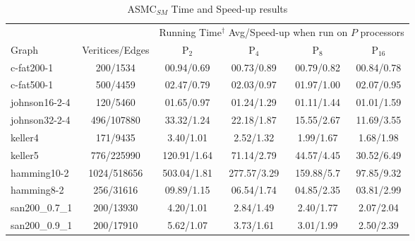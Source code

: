 \documentclass[11pt]{article}
\begin{document}
\linespread{1}
\begin{table*}[ht!]
\caption{ASMC$_{SM}$ Time and Speed-up results}\label{tab:spar_su_par_table}
\begin{footnotesize}
\begin{center}
\begin{tabular}{|l||c||c|c|c|c|}
\hline
&              & \multicolumn{4}{|c|}{Running Time$^{\dag}$ Avg/Speed-up when run on $P$ processors}\\
\cline{3-6}
Graph&Veritices/Edges& 	P$_2$           &P$_4$            &P$_8$            &P$_{16}$   \\
\hline
c-fat200-1 	    &200/1534 		 &00.94/0.69 &00.73/0.89 &00.79/0.82 &00.84/0.78\\  %
c-fat500-1 	    &500/4459 		 &02.47/0.79 &02.03/0.97 &01.97/1.00 &02.07/0.95\\  %
\hline                                                                                   
johnson16-2-4 	&120/5460 		 &01.65/0.97 &01.24/1.29 &01.11/1.44 &01.01/1.59\\  %
johnson32-2-4 	&496/107880 	 &33.32/1.24 &22.18/1.87 &15.55/2.67 &11.69/3.55\\  %
\hline                                  
keller4      	&171/9435 		 &3.40/1.01     &2.52/1.32     &1.99/1.67   &1.68/1.98\\  %
keller5 	    &776/225990 	 &120.91/1.64 &71.14/2.79 &44.57/4.45 &30.52/6.49\\
\hline                                                                                   
hamming10-2 	&1024/518656 	 &503.04/1.81 &277.57/3.29 &159.88/5.7  &97.85/9.32\\
hamming8-2 	    &256/31616 	     &09.89/1.15 &06.54/1.74 &04.85/2.35 &03.81/2.99\\
\hline                                                                                   
san200\_0.7\_1 	&200/13930 	     &4.20/1.01 &2.84/1.49 &2.40/1.77 &2.07/2.04\\%
san200\_0.9\_1 	&200/17910 	     &5.62/1.07 &3.73/1.61 &3.01/1.99 &2.50/2.39\\

\end{tabular}
\end{center}
\end{footnotesize}
\end{table*}
\end{document}
